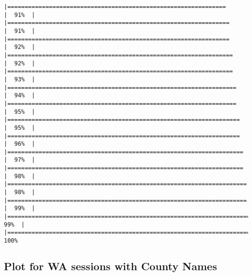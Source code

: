 \documentclass[
]{article}
\begin{document}
\begin{verbatim}
|===============================================================       |  91%  |                                                                              |================================================================      |  91%  |                                                                              |================================================================      |  92%  |                                                                              |=================================================================     |  92%  |                                                                              |=================================================================     |  93%  |                                                                              |==================================================================    |  94%  |                                                                              |==================================================================    |  95%  |                                                                              |===================================================================   |  95%  |                                                                              |===================================================================   |  96%  |                                                                              |====================================================================  |  97%  |                                                                              |====================================================================  |  98%  |                                                                              |===================================================================== |  98%  |                                                                              |===================================================================== |  99%  |                                                                              |======================================================================|  99%  |                                                                              |======================================================================| 100%
\end{verbatim}

\hypertarget{plot-for-wa-sessions-with-county-names}{%
\subsection{Plot for WA sessions with County
Names}\label{plot-for-wa-sessions-with-county-names}}
\end{document}
